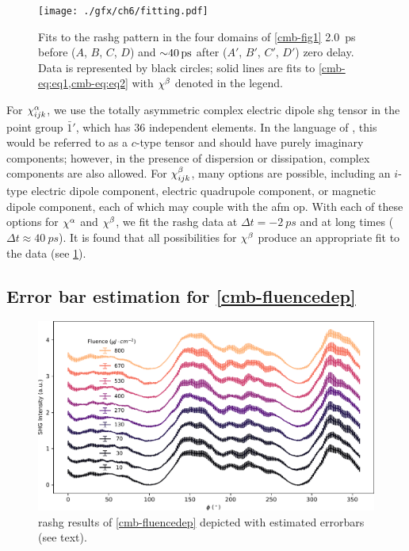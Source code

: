 \begin{landscape}
\begin{figure}
\centering
\texttt{[image: ./gfx/ch6/fitting.pdf]}
\caption{
\label{cmb-fitting}
Fits to the \gls{rashg} pattern in the four domains of \cref{cmb-fig1} \qty{2.0}{ps} before ($A$, $B$, $C$, $D$) and ${\sim} \qty{40}{ps}$ after ($A'$, $B'$, $C'$, $D'$) zero delay.
Data is represented by black circles; solid lines are fits to \cref{cmb-eq:eq1,cmb-eq:eq2} with $\chi^\beta$ denoted in the legend.
}
\end{figure}
\end{landscape}

For $\chi^\alpha_{ijk}$, we use the totally asymmetric complex electric dipole \gls{shg} tensor in the point group $\bar{1}'$, which has $36$ independent elements.
In the language of \citet{birss}, this would be referred to as a $c$-type tensor and should have purely imaginary components; however, in the presence of dispersion or dissipation, complex components are also allowed.
For $\chi^\beta_{ijk}$, many options are possible, including an $i$-type electric dipole component, electric quadrupole component, or magnetic dipole component, each of which may couple with the \gls{afm} \gls{op}.
With each of these options for $\chi^\alpha$ and $\chi^\beta$, we fit the \gls{rashg} data at $\Delta t=\qty{-2}{ps}$ and at long times ($\Delta t\approx \qty{40}{ps}$).
It is found that all possibilities for $\chi^\beta$ produce an appropriate fit to the data (see \cref{cmb-fitting}).

\subsection{Error bar estimation for \cref{cmb-fluencedep}}

\begin{figure}
\centering
\includegraphics[width=\textwidth]{./gfx/ch6/errorbars.pdf}
\caption{\label{cmb-errorbars}\gls{rashg} results of \cref{cmb-fluencedep} depicted with estimated errorbars (see text).}
\end{figure}

